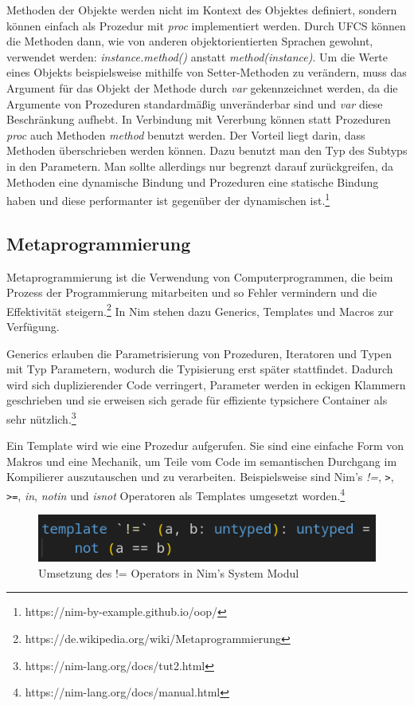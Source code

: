 \documentclass[11pt]{report}
\begin{document}
Methoden der Objekte werden nicht im Kontext des Objektes definiert, sondern können einfach als Prozedur mit \emph{proc} implementiert werden. Durch UFCS können die Methoden dann, wie von anderen objektorientierten Sprachen gewohnt, verwendet werden: \emph{instance.method()} anstatt \emph{method(instance)}.
Um die Werte eines Objekts beispielsweise mithilfe von Setter-Methoden zu verändern, muss das Argument für das Objekt der Methode durch \emph{var} gekennzeichnet werden, da die Argumente von Prozeduren standardmäßig unveränderbar sind und \emph{var} diese Beschränkung aufhebt.
In Verbindung mit Vererbung können statt Prozeduren \emph{proc} auch Methoden \emph{method} benutzt werden. Der Vorteil liegt darin, dass Methoden überschrieben werden können. Dazu benutzt man den Typ des Subtyps in den Parametern. Man sollte allerdings nur begrenzt darauf zurückgreifen, da Methoden eine dynamische Bindung und Prozeduren eine statische Bindung haben und diese performanter ist gegenüber der dynamischen ist.\footnote{https://nim-by-example.github.io/oop/}


\subsection{Metaprogrammierung}
Metaprogrammierung ist die Verwendung von Computerprogrammen, die beim Prozess der Programmierung mitarbeiten und so Fehler vermindern und die Effektivität steigern.\footnote{https://de.wikipedia.org/wiki/Metaprogrammierung} In Nim stehen dazu Generics, Templates und Macros zur Verfügung.

Generics erlauben die Parametrisierung von Prozeduren, Iteratoren und Typen mit Typ Parametern, wodurch die Typisierung erst später stattfindet. Dadurch wird sich duplizierender Code verringert, Parameter werden in eckigen Klammern geschrieben und sie erweisen sich gerade für effiziente typsichere Container als sehr nützlich.\footnote{https://nim-lang.org/docs/tut2.html}

Ein Template wird wie eine Prozedur aufgerufen. Sie sind eine einfache Form von Makros und eine Mechanik, um Teile vom Code im semantischen Durchgang im Kompilierer auszutauschen und zu verarbeiten. Beispielsweise sind Nim's \emph{!=}, \verb|>|, \verb|>=|, \emph{in}, \emph{notin} und \emph{isnot} Operatoren als Templates umgesetzt worden.\footnote{https://nim-lang.org/docs/manual.html}
\begin{figure}[htp]
\centering
\includegraphics[scale=0.50]{images/image2.png}
\caption{Umsetzung des != Operators in Nim's System Modul}
\label{}
\end{figure}
\end{document}
